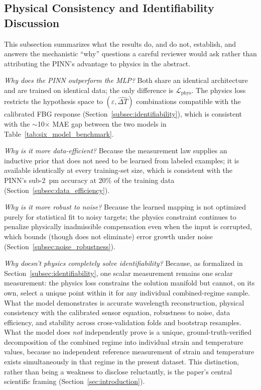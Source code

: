 \documentclass[journal,twoside,web]{ieeecolor}
\begin{document}
\subsection{Physical Consistency and Identifiability Discussion}
\label{subsec:identifiability_discussion}

This subsection summarizes what the results do, and do not, establish, and
answers the mechanistic ``why'' questions a careful reviewer would ask
rather than attributing the PINN's advantage to physics in the abstract.

\emph{Why does the PINN outperform the MLP?} Both share an identical
architecture and are trained on identical data; the only difference is
$\mathcal{L}_{\text{phys}}$. The physics loss restricts the hypothesis space
to $(\hat\varepsilon,\widehat{\Delta T})$ combinations compatible with the
calibrated FBG response (Section~\ref{subsec:identifiability}), which is
consistent with the $\sim$10$\times$ MAE gap between the two models in
Table~\ref{tab:six_model_benchmark}.

\emph{Why is it more data-efficient?} Because the measurement law supplies
an inductive prior that does not need to be learned from labeled examples;
it is available identically at every training-set size, which is consistent
with the PINN's sub-2~pm accuracy at 20\% of the training data
(Section~\ref{subsec:data_efficiency}).

\emph{Why is it more robust to noise?} Because the learned mapping is not
optimized purely for statistical fit to noisy targets; the physics
constraint continues to penalize physically inadmissible compensation even
when the input is corrupted, which bounds (though does not eliminate) error
growth under noise (Section~\ref{subsec:noise_robustness}).

\emph{Why doesn't physics completely solve identifiability?} Because, as
formalized in Section~\ref{subsec:identifiability}, one scalar measurement
remains one scalar measurement: the physics loss constrains the solution
manifold but cannot, on its own, select a unique point within it for any
individual combined-regime sample. What the model demonstrates is accurate
wavelength reconstruction, physical consistency with the calibrated sensor
equation, robustness to noise, data efficiency, and stability across
cross-validation folds and bootstrap resamples. What the model does
\emph{not} independently prove is a unique, ground-truth-verified
decomposition of the combined regime into individual strain and temperature
values, because no independent reference measurement of strain and
temperature exists simultaneously in that regime in the present dataset.
This distinction, rather than being a weakness to disclose reluctantly, is
the paper's central scientific framing (Section~\ref{sec:introduction}).
\end{document}
